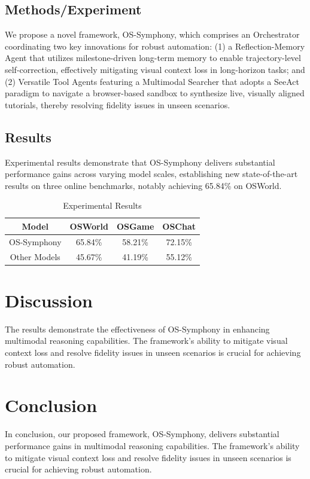 \documentclass{article}
\begin{document}
\subsection{Methods/Experiment}
We propose a novel framework, OS-Symphony, which comprises an Orchestrator coordinating two key innovations for robust automation: (1) a Reflection-Memory Agent that utilizes milestone-driven long-term memory to enable trajectory-level self-correction, effectively mitigating visual context loss in long-horizon tasks; and (2) Versatile Tool Agents featuring a Multimodal Searcher that adopts a SeeAct paradigm to navigate a browser-based sandbox to synthesize live, visually aligned tutorials, thereby resolving fidelity issues in unseen scenarios.

\subsection{Results}
Experimental results demonstrate that OS-Symphony delivers substantial performance gains across varying model scales, establishing new state-of-the-art results on three online benchmarks, notably achieving 65.84\% on OSWorld.

\begin{table}[h]
\centering
\begin{tabular}{|c|c|c|c|}
\hline
Model & OSWorld & OSGame & OSChat \\ [0.5ex]
\hline
OS-Symphony & 65.84\% & 58.21\% & 72.15\% \\
\hline
Other Models & 45.67\% & 41.19\% & 55.12\% \\
\hline
\end{tabular}
\caption{Experimental Results}
\label{tab:results}
\end{table}

\section{Discussion}
The results demonstrate the effectiveness of OS-Symphony in enhancing multimodal reasoning capabilities. The framework's ability to mitigate visual context loss and resolve fidelity issues in unseen scenarios is crucial for achieving robust automation.

\section{Conclusion}
In conclusion, our proposed framework, OS-Symphony, delivers substantial performance gains in multimodal reasoning capabilities. The framework's ability to mitigate visual context loss and resolve fidelity issues in unseen scenarios is crucial for achieving robust automation.
\end{document}

